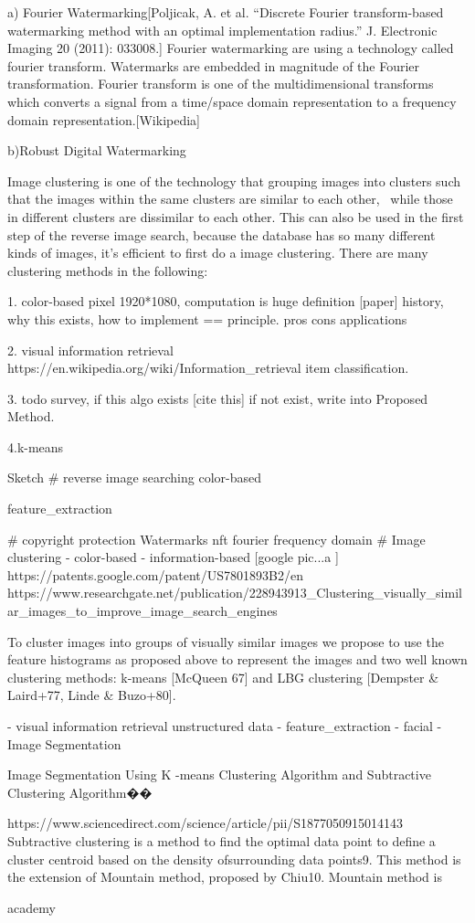 a) Fourier Watermarking[Poljicak, A. et al. “Discrete Fourier transform-based watermarking method with an optimal implementation radius.” J. Electronic Imaging 20 (2011): 033008.]
Fourier watermarking are using a technology called fourier transform.
Watermarks are embedded in magnitude of the Fourier transformation.
Fourier transform is one of the multidimensional transforms which converts a signal from a time/space domain representation to a frequency domain representation.[Wikipedia]


b)Robust Digital Watermarking




Image clustering is one of the technology that grouping images into clusters such that the images within the same clusters are similar to each other, \
while those in different clusters are dissimilar to each other.
This can also be used in the first step of the reverse image search,
because the database has so many different kinds of images,
it's efficient to first do a image clustering.
There are many clustering methods in the following:

1. color-based pixel
1920*1080, computation is huge
definition [paper] \cite{}
history, why this exists, 
how to implement == principle.
pros cons
applications

2. visual information retrieval
https://en.wikipedia.org/wiki/Information_retrieval
item classification.


3. todo survey, if this algo exists [cite this]
if not exist, write into Proposed Method.

4.k-means










Sketch
# reverse image searching
    color-based

    feature_extraction   

# copyright protection
    Watermarks  nft fourier frequency domain
# Image clustering
    - color-based
    - information-based [google pic...a ]
    https://patents.google.com/patent/US7801893B2/en  
    https://www.researchgate.net/publication/228943913_Clustering_visually_similar_images_to_improve_image_search_engines  {

To cluster images into groups of visually similar images we propose to use the feature histograms as proposed above to represent the images and two well known clustering methods: k-means [McQueen 67] and LBG clustering [Dempster & Laird+77, Linde & Buzo+80]. 
    }
        - visual information retrieval
         unstructured data
        - feature_extraction   
        - facial 
        - Image Segmentation  

Image Segmentation Using K -means Clustering Algorithm and Subtractive Clustering Algorithm��{
https://www.sciencedirect.com/science/article/pii/S1877050915014143
Subtractive clustering is a method to find the optimal data point to define a cluster centroid based on the density ofsurrounding data points9. This method is the extension of Mountain method, proposed by Chiu10. Mountain method is

}




academy